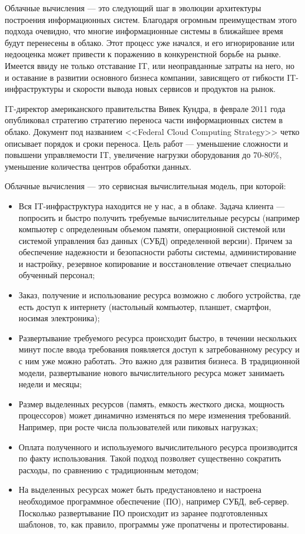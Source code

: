 Облачные вычисления --- это следующий шаг в эволюции архитектуры построения информационных систем.
Благодаря огромным преимуществам этого подхода очевидно, что многие информационные системы в ближайшее время будут перенесены в облако.
Этот процесс уже начался, и его игнорирование или недооценка может привести к поражению в конкуренстной борьбе на рынке.
Имеется ввиду не только отставание IT, или неоправданные затраты на него, но и оставание в развитии основного бизнеса компании, зависящего от гибкости IT-инфраструктуры и скорости вывода новых сервисов и продуктов на рынок.

IT-директор американского правительства Вивек Кундра, в феврале 2011 года опубликовал стратегию стратегию переноса части информационных систем в облако.
Документ под названием <<Federal Cloud Computing Strategy>> четко описывает порядок и сроки переноса. 
Цель работ --- уменьшение сложности и повышени управляемости IT, увеличение нагрузки оборудования до 70-80\%, уменьшение количества центров обработки данных.

Облачные вычисления --- это сервисная вычислительная модель, при которой:
\begin{itemize}
  \item Вся IT-инфраструктура находится не у нас, а в облаке.
  Задача клиента --- попросить и быстро получить требуемые вычислительные ресурсы (например компьютер с определенным объемом памяти, операционной системой или системой управления баз данных (СУБД) определенной версии).
  Причем за обеспечение надежности и безопасности работы системы, администирование и настройку, резервное копирование и восстановление отвечает специально обученный персонал;
  \item Заказ, получение и использование ресурса возможно с любого устройства, где есть доступ к интернету (настольный компьютер, планшет, смартфон, носимая электроника);
  \item Развертывание требуемого ресурса происходит быстро, в течении нескольких минут после ввода требования появляется доступ к затребованному ресурсу и с ним уже можно работать.
  Это важно для развития бизнеса.
  В традиционной модели, развертывание нового вычислительного ресурса может занимаеть недели и месяцы;
  \item Размер выделенных ресурсов (память, емкость жесткого диска, мощность процессоров) может динамично изменяться по мере изменения требований.
  Например, при росте числа пользователей или пиковых нагрузках;
  \item Оплата полученного и используемого вычислительного ресурса производится по факту использования.
  Такой подход позволяет существенно сократить расходы, по сравнению с традиционным методом;
  \item На выделенных ресурсах может быть предустановлено и настроена необходимое программное обеспечение (ПО), например СУБД, веб-сервер.
  Посколько развертывание ПО происходит из заранее подготовленных шаблонов, то, как правило, программы уже пропатчены и протестированы.
\end{itemize}

